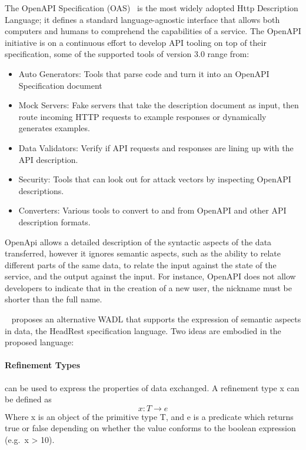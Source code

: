 The OpenAPI Specification (OAS)~\cite{openAPI} is the most widely adopted Http Description Language;
it defines a standard language-agnostic interface that allows both computers and humans to comprehend the capabilities of a service.
The OpenAPI initiative is on a continuous effort to develop API tooling on top of their specification, some of the supported tools of version 3.0 range from:
\begin{itemize}
    \setlength\itemsep{0em}
    \item Auto Generators: Tools that parse code and turn it into an OpenAPI Specification document
    \item Mock Servers: Fake servers that take the description document as input, then route incoming HTTP requests to example responses or dynamically generates examples.
    \item Data Validators: Verify if API requests and responses are lining up with the API description.
    \item Security: Tools that can look out for attack vectors by inspecting OpenAPI descriptions.
    \item Converters: Various tools to convert to and from OpenAPI and other API description formats.
\end{itemize}

OpenApi allows a detailed description of the syntactic aspects of the data transferred, however it ignores semantic aspects, such as the ability to relate
different parts of the same data, to relate the input against the state of the service, and the output against the input.
For instance, OpenAPI does not allow developers to indicate that in the creation of a new user, the nickname must be shorter
than the full name.

\citeauthor{headRest}~\cite{headRest} proposes an alternative WADL that supports the expression of semantic aspects in data, the HeadRest specification language.
Two ideas are embodied in the proposed language:

\paragraph{Refinement Types~\cite{freeman1991refinement}} can be used to express the properties of data exchanged.
A refinement type x can be defined as
\[ x:T \rightarrow e \]
Where x is an object of the primitive type T, and e is a predicate which returns true or false depending on whether the value conforms to the boolean expression (e.g.\ x > 10).

